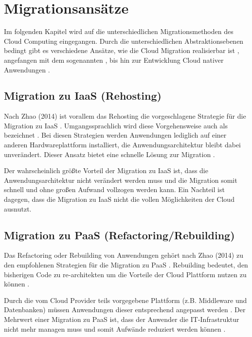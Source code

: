 \section{Migrationsansätze}

Im folgenden Kapitel wird auf die unterschiedlichen Migrationsmethoden des Cloud Computing eingegangen.
Durch die unterschiedlichen Abstraktionsebenen bedingt gibt es verschiedene Ansätze, wie die Cloud Migration realisierbar ist \cite[Vgl.][S. 226]{Surianarayanan2019},
angefangen mit dem sogenannten \grqq{}, bis hin zur Entwicklung Cloud nativer Anwendungen \cite[Vgl.][S. 144]{Zhao2014}.

\subsection{Migration zu IaaS (Rehosting)}
Nach Zhao (2014) ist vorallem das Rehosting die vorgeschlagene Strategie für die Migration zu \ac{IaaS} \cite[Vgl.][S. 144]{Zhao2014}.
Umgangssprachlich wird diese Vorgehensweise auch als \grqq{} bezeichnet \cite[Vgl.][]{NetApp}.
Bei diesen Strategien werden Anwendungen lediglich auf einer anderen Hardwareplattform installiert, die Anwendungsarchitektur bleibt dabei
unverändert. Dieser Ansatz bietet eine schnelle Lösung zur Migration \cite[Vgl.][]{CIO}.

Der wahrscheinlich größte Vorteil der Migration zu \ac{IaaS} ist, dass die Anwendungsarchitektur nicht verändert werden muss und die Migration somit
schnell und ohne großen Aufwand vollzogen werden kann. Ein Nachteil ist dagegen, dass die Migration zu \ac{IaaS} nicht die vollen Möglichkeiten der
Cloud ausnutzt.

\subsection{Migration zu PaaS (Refactoring/Rebuilding)}
Das Refactoring oder Rebuilding von Anwendungen gehört nach Zhao (2014) zu den empfohlenen Strategien für die Migration zu \ac{PaaS} \cite[Vgl.][S. 144]{Zhao2014}.
Rebuilding bedeutet, den bisherigen Code zu re-architekten um die Vorteile der Cloud Plattform nutzen zu können \cite[Vgl.][]{CIO}.

Durch die vom Cloud Provider teils vorgegebene Plattform (z.B. Middleware und Datenbanken) müssen Anwendungen dieser entsprechend angepasst werden \cite[Vgl.][S. 227]{Surianarayanan2019}.
Der Mehrwert einer Migration zu \ac{PaaS} ist, dass der Anwender die IT-Infrastruktur nicht mehr managen muss und somit Aufwände reduziert werden können
\cite[Vgl.][S. 6]{Pahl}.


